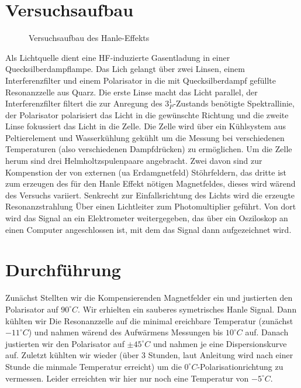 \documentclass[12pt]{article}
\begin{document}
\section{Versuchsaufbau}
\begin{figure}[H]  
\centering
\caption{Versuchsaufbau des Hanle-Effekts}
\end{figure}

Als Lichtquelle dient eine HF-induzierte Gasentladung in einer Quecksilberdampflampe. Das Lich gelangt über zwei Linsen, einem Interferenzfilter und einem Polarisator in die mit Quecksilberdampf gefüllte Resonanzzelle aus Quarz. Die erste Linse macht das Licht parallel, der Interferenzfilter filtert die zur Anregung des $3_P^1$-Zustands benötigte Spektrallinie, der Polarisator polarisiert das Licht in die gewünschte Richtung und die zweite Linse fokussiert das Licht in die Zelle. Die Zelle wird über ein Kühlsystem aus Peltierelement und Wasserkühlung gekühlt um die Messung bei verschiedenen Temperaturen (also verschiedenen Dampfdrücken) zu ermöglichen. Um die Zelle herum sind drei Helmholtzspulenpaare angebracht. Zwei davon sind zur Kompenstion der von externen (ua Erdamgnetfeld) Stöhrfeldern, das dritte ist zum erzeugen des für den Hanle Effekt nötigen Magnetfeldes, dieses wird wärend des Versuchs variiert. Senkrecht zur Einfallsrichtung des Lichts wird die erzeugte Resonanzstrahlung Über einen Lichtleiter zum Photomultiplier geführt. Von dort wird das Signal an ein Elektrometer weitergegeben, das über ein Osziloskop an einen Computer angeschlossen ist, mit dem das Signal dann aufgezeichnet wird.
\newpage

\section{Durchführung}
Zunächst Stellten wir die Kompensierenden Magnetfelder ein und justierten den Polarisator auf $90^\circ C$. Wir erhielten ein sauberes symetrisches Hanle Signal. Dann kühlten wir Die Resonanzzelle auf die minimal ereichbare Temperatur (zunächst $-11^\circ C$) und nahmen wärend des Aufwärmens Messungen bis $10^\circ C$ auf. Danach justierten wir den Polarisator auf $\pm 45^\circ C$ und nahmen je eine Dispersionskurve auf. Zuletzt kühlten wir wieder (über 3 Stunden, laut Anleitung wird nach einer Stunde die minmale Temperatur erreicht) um die $0^\circ C$-Polarisationrichtung zu vermessen. Leider erreichten wir hier nur noch eine Temperatur von $-5^\circ C$. 
\end{document}
